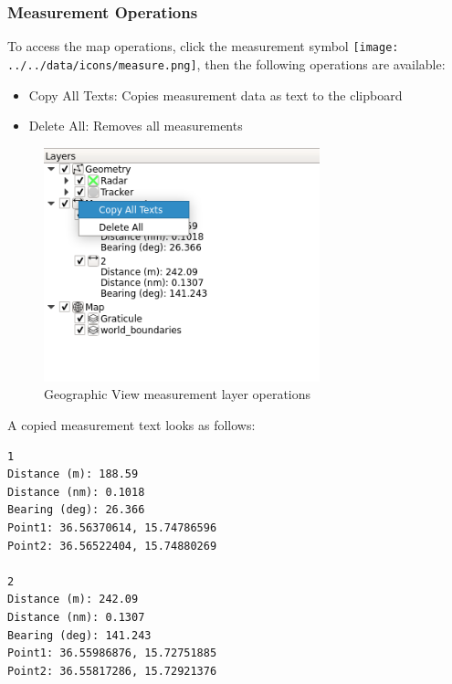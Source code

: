 \subsubsection{Measurement Operations}
\label{sec:geo_measure_ops}

To access the map operations, click the measurement symbol \texttt{[image: ../../data/icons/measure.png]}, then the following operations are available:

\begin{itemize}
 \item Copy All Texts: Copies measurement data as text to the clipboard
 \item Delete All: Removes all measurements
\end{itemize} 

\begin{figure}[H]
    \includegraphics[width=8cm,frame]{figures/geoview_measure_ops.png}
  \caption{Geographic View measurement layer operations}
\end{figure}

A copied measurement text looks as follows:

\begin{lstlisting}
1
Distance (m): 188.59
Distance (nm): 0.1018
Bearing (deg): 26.366
Point1: 36.56370614, 15.74786596
Point2: 36.56522404, 15.74880269

2
Distance (m): 242.09
Distance (nm): 0.1307
Bearing (deg): 141.243
Point1: 36.55986876, 15.72751885
Point2: 36.55817286, 15.72921376
\end{lstlisting}
